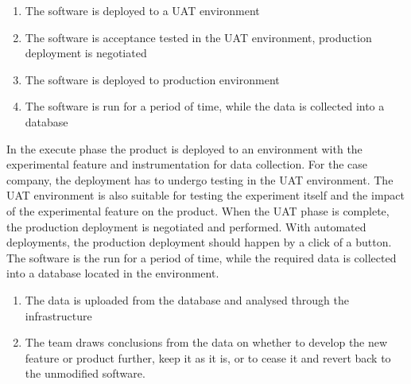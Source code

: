 \documentclass[english]{tktltiki2}
\theoremstyle{definition}
\theoremstyle{remark}
\begin{document}


\begin{enumerate}
  \item The software is deployed to a UAT environment %
  \item The software is acceptance tested in the UAT environment, production deployment is negotiated
  \item The software is deployed to production environment
  \item The software is run for a period of time, while the data is collected into a database
  
\end{enumerate}

In the execute phase the product is deployed to an environment with the experimental feature and instrumentation for data collection. For the case company, the deployment has to undergo testing in the UAT environment. The UAT environment is also suitable for testing the experiment itself and the impact of the experimental feature on the product. When the UAT phase is complete, the production deployment is negotiated and performed. With automated deployments, the production deployment should happen by a click of a button. The software is the run for a period of time, while the required data is collected into a database located in the environment. 

\begin{enumerate}
  \item The data is uploaded from the database and analysed through the infrastructure
  \item The team draws conclusions from the data on whether to develop the new feature or product further, keep it as it is, or to cease it and revert back to the unmodified software. 
\end{enumerate}
\end{document}

